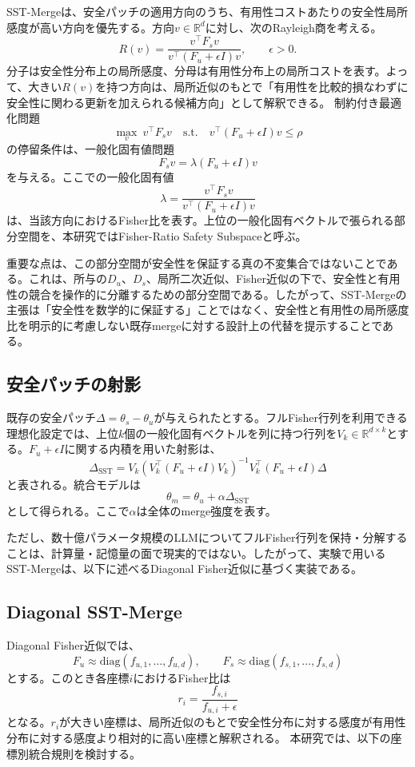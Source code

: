 \documentclass{article}
\begin{document}
SST-Mergeは、安全パッチの適用方向のうち、有用性コストあたりの安全性局所感度が高い方向を優先する。方向\(v \in \mathbb{R}^d\)に対し、次のRayleigh商を考える。
\[
R(v)
=
\frac{v^\top F_s v}
{v^\top (F_u+\epsilon I)v},
\qquad \epsilon > 0.
\]
分子は安全性分布上の局所感度、分母は有用性分布上の局所コストを表す。よって、大きい\(R(v)\)を持つ方向は、局所近似のもとで「有用性を比較的損なわずに安全性に関わる更新を加えられる候補方向」として解釈できる。
制約付き最適化問題
\[
\max_v \ v^\top F_s v
\quad
\mathrm{s.t.}
\quad
v^\top(F_u+\epsilon I)v \leq \rho
\]
の停留条件は、一般化固有値問題
\[
F_s v
=
\lambda(F_u+\epsilon I)v
\]
を与える。ここでの一般化固有値
\[
\lambda
=
\frac{v^\top F_s v}
{v^\top(F_u+\epsilon I)v}
\]
は、当該方向におけるFisher比を表す。上位の一般化固有ベクトルで張られる部分空間を、本研究ではFisher-Ratio Safety Subspaceと呼ぶ。

重要な点は、この部分空間が安全性を保証する真の不変集合ではないことである。これは、所与の\(D_u\)、\(D_s\)、局所二次近似、Fisher近似の下で、安全性と有用性の競合を操作的に分離するための部分空間である。したがって、SST-Mergeの主張は「安全性を数学的に保証する」ことではなく、安全性と有用性の局所感度比を明示的に考慮しない既存mergeに対する設計上の代替を提示することである。

\subsection{安全パッチの射影}

既存の安全パッチ\(\Delta=\theta_s-\theta_u\)が与えられたとする。フルFisher行列を利用できる理想化設定では、上位\(k\)個の一般化固有ベクトルを列に持つ行列を\(V_k \in \mathbb{R}^{d\times k}\)とする。\(F_u+\epsilon I\)に関する内積を用いた射影は、
\[
\Delta_{\mathrm{SST}}
=
V_k
\left(
V_k^\top(F_u+\epsilon I)V_k
\right)^{-1}
V_k^\top(F_u+\epsilon I)\Delta
\]
と表される。統合モデルは
\[
\theta_m
=
\theta_u+\alpha\Delta_{\mathrm{SST}}
\]
として得られる。ここで\(\alpha\)は全体のmerge強度を表す。

ただし、数十億パラメータ規模のLLMについてフルFisher行列を保持・分解することは、計算量・記憶量の面で現実的ではない。したがって、実験で用いるSST-Mergeは、以下に述べるDiagonal Fisher近似に基づく実装である。

\subsection{Diagonal SST-Merge}

Diagonal Fisher近似では、
\[
F_u \approx
\mathrm{diag}(f_{u,1},\ldots,f_{u,d}),
\qquad
F_s \approx
\mathrm{diag}(f_{s,1},\ldots,f_{s,d})
\]
とする。このとき各座標\(i\)におけるFisher比は
\[
r_i
=
\frac{f_{s,i}}{f_{u,i}+\epsilon}
\]
となる。\(r_i\)が大きい座標は、局所近似のもとで安全性分布に対する感度が有用性分布に対する感度より相対的に高い座標と解釈される。
本研究では、以下の座標別統合規則を検討する。
\end{document}
